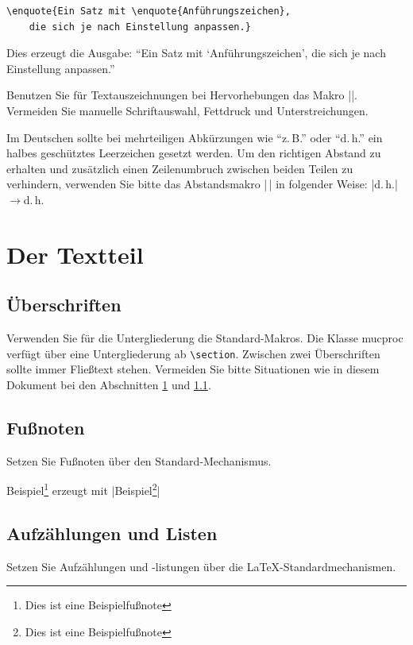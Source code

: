 \documentclass[ngerman]{mucproc}
\newenvironment{minted}[2][]{\endgraf\verbatim}{\endverbatim}
\begin{document}
\begin{verbatim}
\enquote{Ein Satz mit \enquote{Anführungszeichen},
	die sich je nach Einstellung anpassen.}
\end{verbatim}
Dies erzeugt die Ausgabe: \enquote{Ein Satz mit \enquote{Anführungszeichen}, die sich je nach Einstellung anpassen.}

Benutzen Sie für Textauszeichnungen bei Hervorhebungen das Makro |\emph{}|. Vermeiden Sie manuelle Schriftauswahl, Fettdruck und Unterstreichungen.

Im Deutschen sollte bei mehrteiligen Abkürzungen wie \enquote{z.\,B.} oder \enquote{d.\,h.} ein halbes geschütztes Leerzeichen gesetzt werden.
Um den richtigen Abstand zu erhalten und zusätzlich einen Zeilenumbruch zwischen beiden Teilen zu verhindern, verwenden Sie bitte das Abstandsmakro |\,| in folgender Weise: |d.\,h.|${}\to{}$d.\,h.

\section{Der Textteil}\label{sec:text}
\subsection{Überschriften}\label{sec:sectioning}
Verwenden Sie für die Untergliederung die Standard-Makros. Die Klasse \textsf{mucproc} verfügt über eine Untergliederung ab \texttt{\textbackslash{}section}. Zwischen zwei Überschriften sollte immer Fließtext stehen. Vermeiden Sie bitte Situationen wie in diesem Dokument bei den Abschnitten \ref{sec:text} und \ref{sec:sectioning}.
 


\subsection{Fußnoten}
Setzen Sie Fußnoten über den Standard-Mechanismus.

Beispiel\footnote{Dies ist eine Beispielfußnote} erzeugt mit |Beispiel\footnote{Dies ist eine Beispielfußnote}|

\subsection{Aufzählungen und Listen}
Setzen Sie Aufzählungen und -listungen über die \LaTeX-Standardmechanismen.
\end{document}
